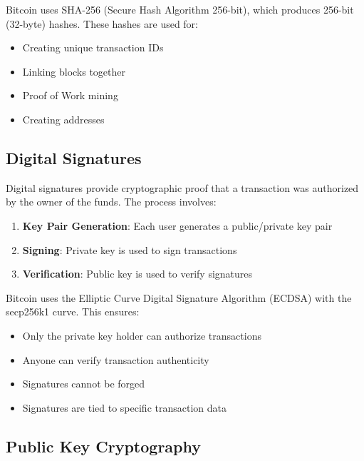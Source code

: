 Bitcoin uses SHA-256 (Secure Hash Algorithm 256-bit), which produces 256-bit (32-byte) hashes. These hashes are used for:
\begin{itemize}
  \item Creating unique transaction IDs
  \item Linking blocks together
  \item {}Proof of Work mining
  \item Creating addresses
\end{itemize}

\subsection{Digital Signatures}
\label{subsec:digital-signatures}

Digital signatures provide cryptographic proof that a transaction was authorized by the owner of the funds. The process involves:

\begin{enumerate}
  \item \textbf{Key Pair Generation}: Each user generates a public/private key pair
  \item \textbf{Signing}: Private key is used to sign transactions
  \item \textbf{Verification}: Public key is used to verify signatures
\end{enumerate}

Bitcoin uses the Elliptic Curve Digital Signature Algorithm (ECDSA) with the secp256k1 curve. This ensures:
\begin{itemize}
  \item Only the private key holder can authorize transactions
  \item Anyone can verify transaction authenticity
  \item {}Signatures cannot be forged
  \item {}Signatures are tied to specific transaction data
\end{itemize}

\subsection{Public Key Cryptography}
\label{subsec:public-key-crypto}

